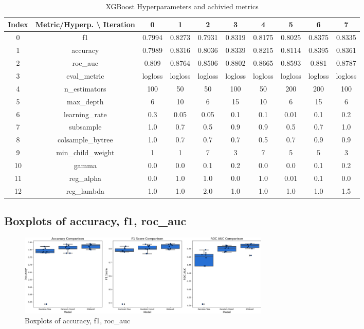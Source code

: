 \documentclass{article}%
\begin{document}
\begin{table}[h!]%
\caption{XGBoost Hyperparameters and achivied metrics}%
\vspace{0.2cm}%
\centering%
\begin{tabular}{|c||c||c||c||c||c||c||c||c||c|}%
\hline%
Index&Metric/Hyperp. \textbackslash{} Iteration&0&1&2&3&4&5&6&7\\%
\hline%
0&f1&0.7994&0.8273&0.7931&0.8319&0.8175&0.8025&0.8375&0.8335\\%
1&accuracy&0.7989&0.8316&0.8036&0.8339&0.8215&0.8114&0.8395&0.8361\\%
2&roc\_auc&0.809&0.8764&0.8506&0.8802&0.8665&0.8593&0.881&0.8787\\%
3&eval\_metric&logloss&logloss&logloss&logloss&logloss&logloss&logloss&logloss\\%
4&n\_estimators&100&50&50&100&50&200&200&100\\%
5&max\_depth&6&10&6&15&10&6&15&6\\%
6&learning\_rate&0.3&0.05&0.05&0.1&0.1&0.01&0.1&0.2\\%
7&subsample&1.0&0.7&0.5&0.9&0.9&0.5&0.7&1.0\\%
8&colsample\_bytree&1.0&0.7&0.7&0.7&0.5&0.7&0.9&0.9\\%
9&min\_child\_weight&1&1&7&3&7&5&5&3\\%
10&gamma&0.0&0.0&0.1&0.2&0.0&0.0&0.1&0.2\\%
11&reg\_alpha&0.0&1.0&1.0&0.0&1.0&0.01&0.1&0.0\\%
12&reg\_lambda&1.0&1.0&2.0&1.0&1.0&1.0&1.0&1.5\\%
\hline%
\end{tabular}%
\end{table}

%
\newpage%
\subsection{Boxplots of accuracy, f1, roc\_auc}%
\label{subsec:Boxplotsofaccuracy,f1,rocauc}%


\begin{figure}[h!]%
\centering%
\includegraphics[width=460px]{ModelOptimization/box_plots_metrics.png}%
\caption{Boxplots of accuracy, f1, roc\_auc}%
\end{figure}
\end{document}
